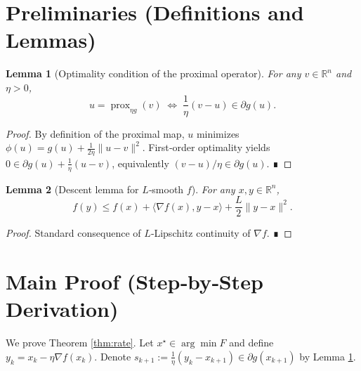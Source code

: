 \documentclass{article}
\newtheorem{lemma}{Lemma}
\newcommand{\prox}{\operatorname{prox}}
\newcommand{\R}{\mathbb{R}}
\begin{document}
\section*{Preliminaries (Definitions and Lemmas)}
\begin{lemma}[Optimality condition of the proximal operator]\label{lem:opt}
For any $v\in\R^{n}$ and $\eta>0$,
\[
u=\prox_{\eta g}(v)\;\Longleftrightarrow\;
\frac{1}{\eta}(v-u)\in\partial g(u).
\tag{L1}
\]
\end{lemma}
\begin{proof}
By definition of the proximal map, $u$ minimizes 
$\phi(u)=g(u)+\frac{1}{2\eta}\|u-v\|^{2}$.  
First‑order optimality yields $0\in\partial g(u)+\frac{1}{\eta}(u-v)$,
equivalently $(v-u)/\eta\in\partial g(u)$. ∎
\end{proof}

\begin{lemma}[Descent lemma for $L$‑smooth $f$]\label{lem:descent}
For any $x,y\in\R^{n}$,
\[
f(y)\le f(x)+\langle\nabla f(x),y-x\rangle+\frac{L}{2}\|y-x\|^{2}.
\tag{L2}
\]
\end{lemma}
\begin{proof}
Standard consequence of $L$‑Lipschitz continuity of $\nabla f$. ∎
\end{proof}

\section*{Main Proof (Step‑by‑Step Derivation)}
We prove Theorem \ref{thm:rate}.  
Let $x^{\star}\in\arg\min F$ and define $y_{k}=x_{k}-\eta\nabla f(x_{k})$.
Denote $s_{k+1}:=\frac{1}{\eta}(y_{k}-x_{k+1})\in\partial g(x_{k+1})$ by Lemma \ref{lem:opt}.
\end{document}
